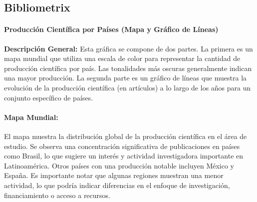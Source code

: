  \subsection{Bibliometrix}
 \paragraph{Producción Científica por Países (Mapa y Gráfico de Líneas) }
 
 \textbf{Descripción General:} Esta gráfica se compone de dos partes. La primera es un mapa mundial que utiliza una escala de color para representar la cantidad de producción científica por país. Las tonalidades más oscuras generalmente indican una mayor producción. La segunda parte es un gráfico de líneas que muestra la evolución de la producción científica (en artículos) a lo largo de los años para un conjunto específico de países. 
\paragraph{Mapa Mundial:}
El mapa muestra la distribución global de la producción científica en el área de estudio. Se observa una concentración significativa de publicaciones en países como Brasil, lo que sugiere un interés y actividad investigadora importante en Latinoamérica. Otros países con una producción notable incluyen México y España. Es importante notar que algunas regiones muestran una menor actividad, lo que podría indicar diferencias en el enfoque de investigación, financiamiento o acceso a recursos. 